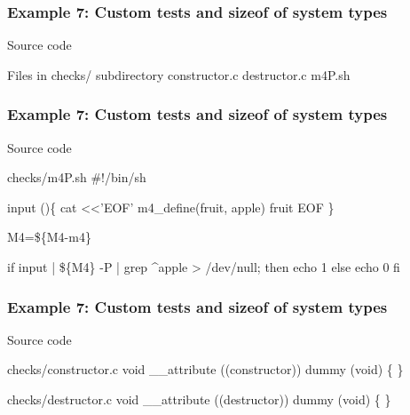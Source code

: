 \documentclass[hyperref={colorlinks=true}]{beamer}
\begin{document}
\begin{frame}[fragile]
  \frametitle{Example 7: Custom tests and sizeof of system types}

\begin{block}{Source code}
\begin{Code}{Files in checks/ subdirectory}
constructor.c
destructor.c
m4P.sh
\prompt{\$}
\end{Code}
\end{block}
\end{frame}

\begin{frame}[fragile]
  \frametitle{Example 7: Custom tests and sizeof of system types}

\begin{block}{Source code}
\begin{Code}{checks/m4P.sh}
#!/bin/sh

input ()\{
    cat <<'EOF'
m4\_define(fruit, apple)
fruit
EOF
\}

M4=\$\{M4-m4\}

if input | \$\{M4\} -P | grep \^{}apple > /dev/null; then
    echo 1
else
    echo 0
fi
\end{Code}
\end{block}
\end{frame}

\begin{frame}[fragile]
  \frametitle{Example 7: Custom tests and sizeof of system types}
\begin{block}{Source code}
\begin{Code}{checks/constructor.c}
void __attribute ((constructor))
        dummy (void)
\{
\}
\end{Code}
\begin{Code}{checks/destructor.c}
void __attribute ((destructor))
        dummy (void)
\{
\}
\end{Code}
\end{block}
\end{frame}
\end{document}
